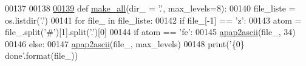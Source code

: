 \begin{DoxyCode}
00137 
00138 
\hypertarget{apap_8py_source_l00139}{}\hyperlink{namespacepyneb_1_1utils_1_1apap_ac957f753a8fc1c667044b4324868753e}{00139} \textcolor{keyword}{def }\hyperlink{namespacepyneb_1_1utils_1_1apap_ac957f753a8fc1c667044b4324868753e}{make\_all}(dir\_ = '.', max\_levels=8):
00140     file\_liste = os.listdir(\textcolor{stringliteral}{'.'})
00141     \textcolor{keywordflow}{for} file\_ \textcolor{keywordflow}{in} file\_liste:
00142         \textcolor{keywordflow}{if} file\_[-1] == \textcolor{stringliteral}{'z'}:
00143             atom = file\_.split(\textcolor{stringliteral}{'#'})[1].split(\textcolor{stringliteral}{'.'})[0]
00144             \textcolor{keywordflow}{if} atom == \textcolor{stringliteral}{'fe'}:
00145                 \hyperlink{namespacepyneb_1_1utils_1_1apap_a4fccb2b8771d515b0be6f8a1921c0c58}{apap2ascii}(file\_, 34)
00146             \textcolor{keywordflow}{else}:
00147                 \hyperlink{namespacepyneb_1_1utils_1_1apap_a4fccb2b8771d515b0be6f8a1921c0c58}{apap2ascii}(file\_, max\_levels)
00148             print(\textcolor{stringliteral}{'\{0\} done'}.format(file\_))
\end{DoxyCode}
